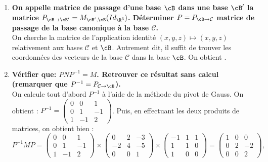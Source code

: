 \documentclass[a4paper, 11pt,reqno]{article}
\begin{document}
\begin{correction}
\begin{enumerate}
		      Ainsi, on obtient:
		      .\\
		      On remarque que la matrice obtenue est triangulaire sup\'erieure, ce qui simplifie beaucoup de calculs.
		\item \textbf{On appelle matrice de passage d'une base $\cB$ dans une base $\cB'$ la matrice $P_{\cB\to\cB'} = M_{\cB',\cB}(Id_{\R^3})$. D\'eterminer $P=P_{\cB\to\mathcal{C}}$ matrice de passage de la base canonique \`a la base $\mathcal{C}$.}\\%
		      On cherche la matrice de l'application identit\'e $(x,y,z) \mapsto (x,y,z)$ relativement aux bases $\mathcal{C}$ et $\cB$. Autrement dit, il suffit de trouver les coordonn\'ees des vecteurs de la base $\mathcal{C}$ dans la base $\cB$. On obtient .
		\item \textbf{V\'erifier que: $PNP^{-1}=M$. Retrouver ce r\'esultat sans calcul (remarquer que $P^{-1}=P_{\mathcal{C} \to \cB}$).}\\
		      On calcule tout d'abord $P^{-1}$ \`a l'aide de la m\'ethode du pivot de Gauss. On obtient : $P^{-1}= \left(\begin{array}{rrr} 0&0&1\\0&1&-1\\1&-1&2 \end{array}\right)$. Puis, en effectuant les deux produits de matrices, on obtient bien :
		      $$P^{-1} M P = \left(\begin{array}{rrr} 0&0&1\\0&1&-1\\1&-1&2 \end{array}\right) \times \left(\begin{array}{rrr} 0&2&-3\\-2&4&-5\\0&0&1 \end{array}\right) \times  \left(\begin{array}{rrr} -1&1&1\\1&1&0\\1&0&0 \end{array}\right)  = \left(\begin{array}{rrr} 1&0&0\\0&2&-2\\0&0&2 \end{array}\right),$$

\end{enumerate}
\end{correction}
\end{document}
